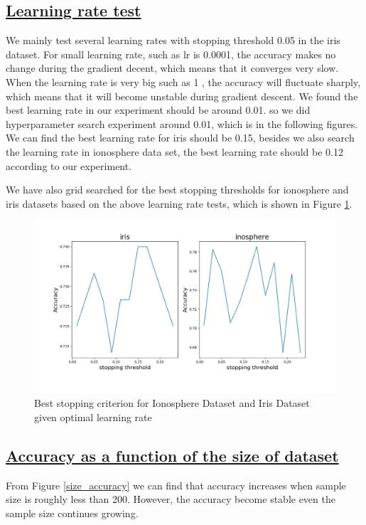 \documentclass[11pt]{scrartcl}
\begin{document}
\subsection*{\underline{Learning rate test}}
We mainly test several learning rates with stopping threshold 0.05 in the iris dataset. For small learning rate, such as lr is 0.0001, the accuracy makes no change during the gradient decent, which means that it converges very slow. When the learning rate is very big such as 1 , the accuracy will fluctuate sharply, which means that it will become unstable during gradient descent. We found the best learning rate in our experiment should be around 0.01. so we did hyperparameter search experiment around 0.01, which is in the following figures. We can find the best learning rate for iris should be 0.15, besides we also search the learning rate in ionosphere data set, the best learning rate should be 0.12 according to our experiment.

We have also grid searched for the best stopping thresholds for ionosphere and iris datasets based on the above learning rate tests, which is shown in Figure \ref{stopping_cri_lr}. 

\begin{figure}[htbp]
	\centering
	\includegraphics[width=0.8\linewidth]{fig/stopping-threshold.png}
	\caption{Best stopping criterion for Ionosphere Dataset and Iris Dataset given optimal learning rate}
	\label{stopping_cri_lr}
\end{figure}

\subsection*{\underline{Accuracy as a function of the size of dataset}}

From Figure \ref{size_accuracy} we can find that accuracy increases when sample size is roughly less than 200. However, the accuracy become stable even the sample size continues growing. 
\end{document}
